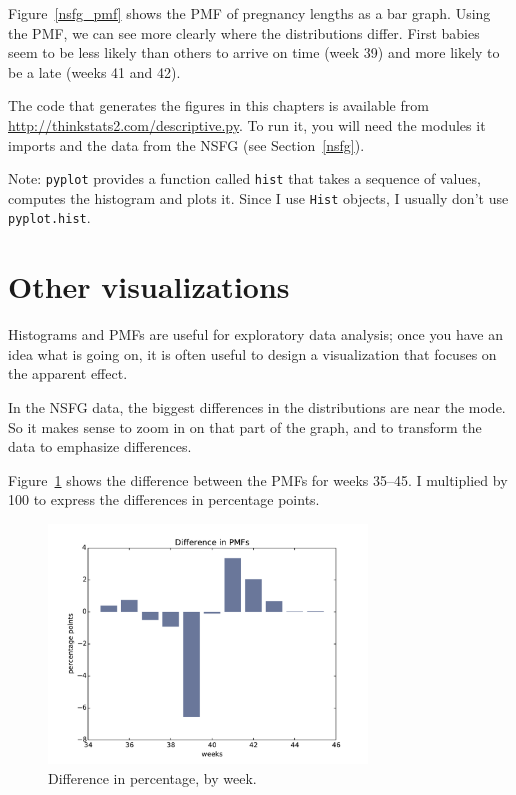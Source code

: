 \documentclass[12pt]{book}
\begin{document}
Figure~\ref{nsfg_pmf} shows the PMF of pregnancy lengths as a bar
graph.  Using the PMF, we can see more clearly where the distributions
differ.  First babies seem to be less likely than others to arrive on
time (week 39) and more likely to be a late (weeks 41 and 42).

The code that generates the figures in this chapters is available from
\url{http://thinkstats2.com/descriptive.py}.  To run it, you will need the
modules it imports and the data from the NSFG (see
Section~\ref{nsfg}).

Note: {\tt pyplot} provides a function called {\tt hist} that
takes a sequence of values, computes the histogram and plots it.
Since I use {\tt Hist} objects, I usually don't use {\tt pyplot.hist}.



\section{Other visualizations}

Histograms and PMFs are useful for exploratory data analysis;
once you have an idea what is going on, it is often useful to
design a visualization that focuses on the apparent effect.

In the NSFG data, the biggest differences in the distributions are
near the mode.  So it makes sense to zoom in on that part of the
graph, and to transform the data to emphasize differences.

Figure~\ref{nsfg_diffs} shows the difference between the PMFs for weeks
35--45.  I multiplied by 100 to express the differences in percentage
points.

\begin{figure}
\centerline{\includegraphics[height=2.5in]{figs/nsfg_diffs.pdf}}
\caption{Difference in percentage, by week.}
\label{nsfg_diffs}
\end{figure}
\end{document}
